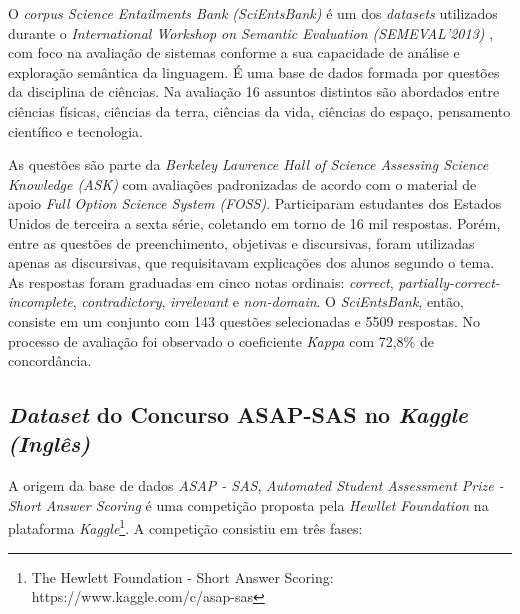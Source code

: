 O \textit{corpus Science Entailments Bank (SciEntsBank)} \cite{dzikovska2012} é um dos \textit{datasets} utilizados durante o \textit{International Workshop on Semantic Evaluation (SEMEVAL'2013)} \cite{dzikovska2013}, com foco na avaliação de sistemas conforme a sua capacidade de análise e exploração semântica da linguagem. É uma base de dados formada por questões da disciplina de ciências. Na avaliação 16 assuntos distintos são abordados entre ciências físicas, ciências da terra, ciências da vida, ciências do espaço, pensamento científico e tecnologia. 

As questões são parte da \textit{Berkeley Lawrence Hall of Science Assessing Science Knowledge (ASK)} com avaliações padronizadas de acordo com o material de apoio \textit{Full Option Science System (FOSS)}. Participaram estudantes dos Estados Unidos de terceira a sexta série, coletando em torno de 16 mil respostas. Porém, entre as questões de preenchimento, objetivas e discursivas, foram utilizadas apenas as discursivas, que requisitavam explicações dos alunos segundo o tema. As respostas foram graduadas em cinco notas ordinais: \textit{correct}, \textit{partially-correct-incomplete}, \textit{contradictory}, \textit{irrelevant} e \textit{non-domain}. O \textit{SciEntsBank}, então, consiste em um conjunto com 143 questões selecionadas e 5509 respostas. No processo de avaliação foi observado o coeficiente \textit{Kappa} com 72,8\% de concordância.

\subsection{\textit{Dataset} do Concurso ASAP-SAS no \textit{Kaggle} \textit{(Inglês)}}
\label{kaggle-db}

A origem da base de dados \textit{ASAP - SAS}, \textit{Automated Student Assessment Prize - Short Answer Scoring} é uma competição proposta pela \textit{Hewllet Foundation} na plataforma \textit{Kaggle}\footnote{The Hewlett Foundation - Short Answer Scoring: https://www.kaggle.com/c/asap-sas}. A competição consistiu em três fases:

